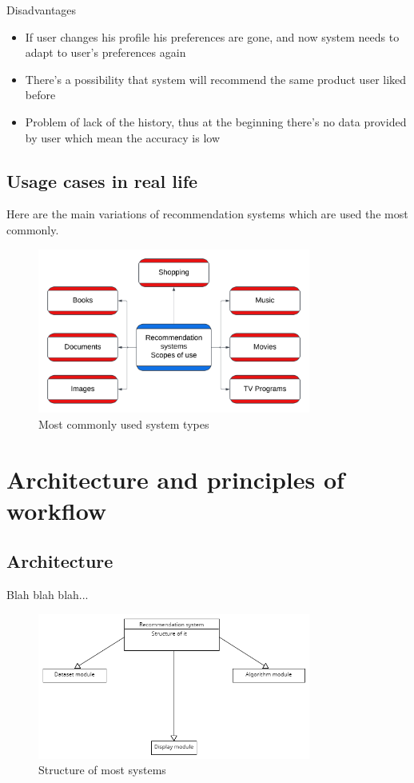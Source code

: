 \documentclass[10pt,twoside,english,a4paper]{article}
\begin{document}
Disadvantages
\begin{itemize}
\item If user changes his profile his preferences are gone, and now system needs to adapt to user's preferences again
\item There's a possibility that system will recommend the same product user liked before
\item Problem of lack of the history, thus at the beginning there's no data provided by user which mean the accuracy is low
\end{itemize}

\subsection{Usage cases in real life}
Here are the main variations of recommendation systems which are used the most commonly.

\begin{figure}[h]
\centering
\includegraphics[width=0.8\textwidth]{system_types}
\caption{Most commonly used system types}
\label{fig:Types}
\end{figure}
\newpage










\section{Architecture and principles of workflow}
\subsection{Architecture}
Blah blah blah...

\begin{figure}[h]
\centering
\includegraphics[width=0.8\textwidth]{system_structure}
\caption{Structure of most systems}
\label{fig:Types}
\end{figure}
\end{document}
